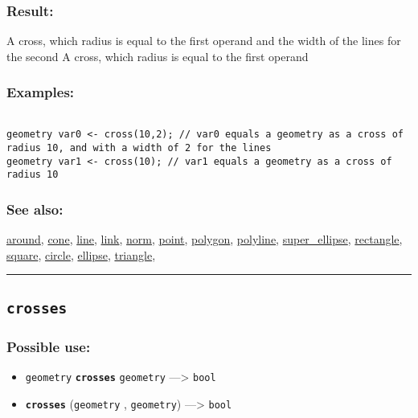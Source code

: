 \documentclass[]{book}
\providecommand{\tightlist}{%
  \setlength{\itemsep}{0pt}\setlength{\parskip}{0pt}}
\theoremstyle{definition}
\theoremstyle{definition}
\theoremstyle{definition}
\theoremstyle{remark}
\begin{document}
\subsubsection{Result:}\label{result-113}

A cross, which radius is equal to the first operand and the width of the
lines for the second A cross, which radius is equal to the first operand

\subsubsection{Examples:}\label{examples-88}

\begin{verbatim}
 
geometry var0 <- cross(10,2); // var0 equals a geometry as a cross of radius 10, and with a width of 2 for the lines  
geometry var1 <- cross(10); // var1 equals a geometry as a cross of radius 10
\end{verbatim}

\subsubsection{See also:}\label{see-also-71}

\href{OperatorsAA\#around}{around}, \href{OperatorsBC\#cone}{cone},
\href{OperatorsIM\#line}{line}, \href{OperatorsIM\#link}{link},
\href{OperatorsNR\#norm}{norm}, \href{OperatorsNR\#point}{point},
\href{OperatorsNR\#polygon}{polygon},
\href{OperatorsNR\#polyline}{polyline},
\href{OperatorsSZ\#super_ellipse}{super\_ellipse},
\href{OperatorsNR\#rectangle}{rectangle},
\href{OperatorsSZ\#square}{square}, \href{OperatorsBC\#circle}{circle},
\href{OperatorsDH\#ellipse}{ellipse},
\href{OperatorsSZ\#triangle}{triangle},

\begin{center}\rule{0.5\linewidth}{\linethickness}\end{center}

\subsection{\texorpdfstring{\texttt{crosses}}{crosses}}\label{crosses}

\subsubsection{Possible use:}\label{possible-use-117}

\begin{itemize}
\tightlist
\item
  \texttt{geometry} \textbf{\texttt{crosses}} \texttt{geometry}
  ---\textgreater{} \texttt{bool}
\item
  \textbf{\texttt{crosses}} (\texttt{geometry} , \texttt{geometry})
  ---\textgreater{} \texttt{bool}
\end{itemize}
\end{document}

